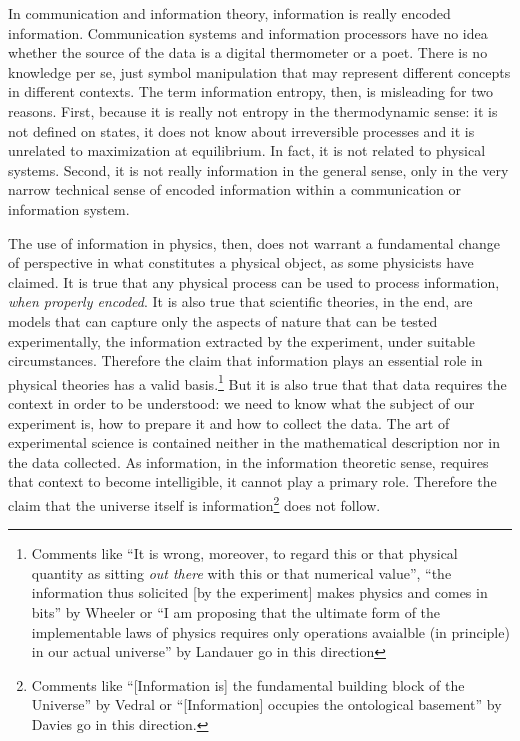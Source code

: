 \documentclass[prb, twocolumn]{revtex4-1}
\begin{document}
In communication and information theory, information is really encoded information. Communication systems and information processors have no idea whether the source of the data is a digital thermometer or a poet. There is no knowledge per se, just symbol manipulation that may represent different concepts in different contexts. The term information entropy, then, is misleading for two reasons. First, because it is really not entropy in the thermodynamic sense: it is not defined on states, it does not know about irreversible processes and it is unrelated to maximization at equilibrium. In fact, it is not related to physical systems. Second, it is not really information in the general sense, only in the very narrow technical sense of encoded information within a communication or information system.

The use of information in physics, then, does not warrant a fundamental change of perspective in what constitutes a physical object, as some physicists have claimed. It is true that any physical process can be used to process information, \emph{when properly encoded}. It is also true that scientific theories, in the end, are models that can capture only the aspects of nature that can be tested experimentally, the information extracted by the experiment, under suitable circumstances. Therefore the claim that information plays an essential role in physical theories has a valid basis.\footnote{Comments like ``It is wrong, moreover, to regard this or that  physical quantity as sitting \emph{out there} with this or that numerical value'', ``the information thus solicited [by the experiment] makes physics and comes in bits'' by Wheeler\cite{Wheeler} or ``I am proposing that the ultimate form of the implementable laws of physics requires only operations avaialble (in principle) in our actual universe'' by Landauer\cite{Landauer} go in this direction} But it is also true that that data requires the context in order to be understood: we need to know what the subject of our experiment is, how to prepare it and how to collect the data. The art of experimental science is contained neither in the mathematical description nor in the data collected. As information, in the information theoretic sense, requires that context to become intelligible, it cannot play a primary role. Therefore the claim that the universe itself is information\footnote{Comments like ``[Information is] the fundamental building block of the Universe'' by Vedral\cite{Vedral} or ``[Information] occupies the ontological basement'' by Davies\cite{Davies} go in this direction.} does not follow.
\end{document}
